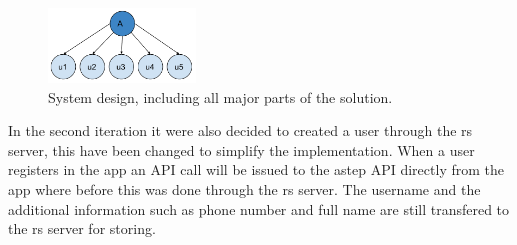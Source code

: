 \begin{figure}[!h]
	\centering
	\includegraphics[width=0.35\textwidth]{figures/userafter.pdf}
	\caption{System design, including all major parts of the solution.}
	\label{fig:userafter}
\end{figure}

In the second iteration it were also decided to created a user through the \gls{rs} server, this have been changed to simplify the implementation.
When a user registers in the app an API call will be issued to the \gls{astep} API directly from the app where before this was done through the \gls{rs} server. 
The username and the additional information such as phone number and full name are still transfered to the \gls{rs} server for storing.
